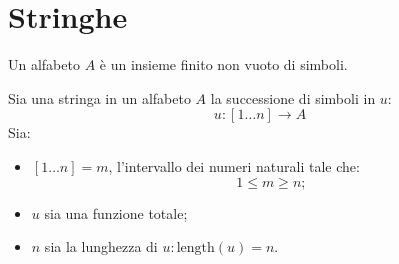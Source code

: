 \chapter{Stringhe}
\begin{theorem}
  Un alfabeto $A$ è un insieme finito non vuoto di simboli.
\end{theorem}
\begin{theorem}
  Sia una stringa in un alfabeto $A$ la successione di simboli in $u$:
  \[u:[1\dots n] \rightarrow A\]
  Sia:
  \begin{itemize}
    \item $[1\dots n] = m$, l'intervallo dei numeri naturali tale che:
      \[
        1\leq m\geq n;
      \]
    \item $u$ sia una funzione totale;
    \item $n$ sia la lunghezza di $u: \text{length}(u)=n$.
  \end{itemize}
\end{theorem}
